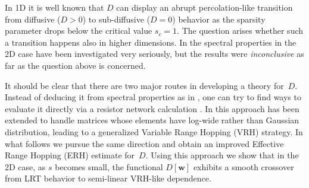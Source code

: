 \documentclass[onecolumn,fleqn,notitlepage,secnumarabic]{revtex4}
\begin{document}
In 1D it is well known \cite{alexander} that $D$ can display an abrupt 
percolation-like transition from diffusive (${D>0}$) to sub-diffusive (${D=0}$) 
behavior as the sparsity parameter drops below the critical value ${s_c=1}$.   
The question arises whether such a transition happens also in 
higher dimensions. In \cite{amir} the spectral properties in the 2D case 
have been investigated very seriously, but the results were {\em inconclusive}  
as far as the question above is concerned.

It should be clear that there are two major routes in developing  
a theory for~$D$. Instead of deducing it from spectral properties 
as in \cite{amir}, one can try to find ways to evaluate it directly 
via a resistor network calculation \cite{miller}.
In \cite{kbd,kbw} this approach has been extended to handle matrices 
whose elements have log-wide rather than Gaussian 
distribution, leading to a generalized Variable Range Hopping (VRH) strategy. 
In what follows we pursue the same direction and obtain an 
improved Effective Range Hopping (ERH) estimate for~$D$.
Using this approach we show that in the 2D case, as $s$ becomes small, 
the functional $D[\bm{w}]$ exhibits a smooth crossover from LRT behavior  
to semi-linear VRH-like dependence.  
\end{document}
